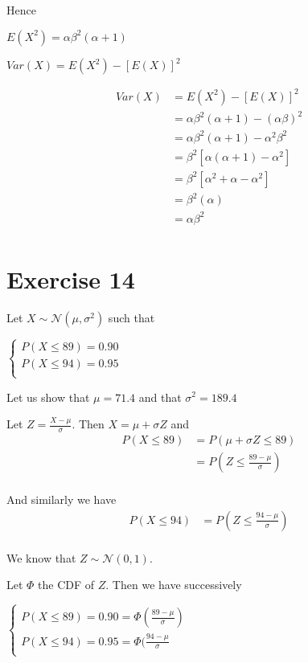 \documentclass[11pt]{article}
\begin{document}
Hence 

$E(X^2)=\alpha \beta^2(\alpha+1)$

$Var(X)=E(X^2)-[E(X)]^2$

\begin{align*}
Var(X)  
&=E(X^2)-[E(X)]^2\\
&=\alpha \beta^2(\alpha+1)-(\alpha \beta)^2\\
&=\alpha \beta^2(\alpha+1)-\alpha ^2 \beta ^2\\
&= \beta ^2 [\alpha(\alpha+1)-\alpha^2]\\
&= \beta ^2 [\alpha^2 +\alpha-\alpha^2]\\
&= \beta ^2 (\alpha)\\
&=  \alpha \beta ^2\\
\end{align*}


\newpage 

\section{Exercise 14}
 Let $X  \sim \mathcal N(\mu,\sigma^2)$  such that

$\begin{cases}
            P(X\le 89)=0.90 \\
            P(X\le 94)=0.95 \\
\end{cases}$


Let us show that $\mu=71.4$  and that $\sigma^2=189.4$

Let $Z=\frac{X-\mu}{\sigma}$. Then $X=\mu+\sigma Z$ and
\begin{align*}
P(X\le 89)&=P(\mu+\sigma Z\le 89)\\
&=P( Z\le \frac{89-\mu}{\sigma})\\
\end{align*}

And similarly we have
\begin{align*}
P(X\le 94)&=P( Z\le \frac{94-\mu}{\sigma})\\
\end{align*}

We know that $Z  \sim \mathcal N(0,1)$.

Let $\Phi$ the CDF of $Z$. Then we have successively

$\begin{cases}
            P(X\le 89)=0.90=\Phi(\frac{89-\mu}{\sigma}) \\
            P(X\le 94)=0.95=\Phi(\frac{94-\mu}{\sigma} \\
\end{cases}$
\end{document}

